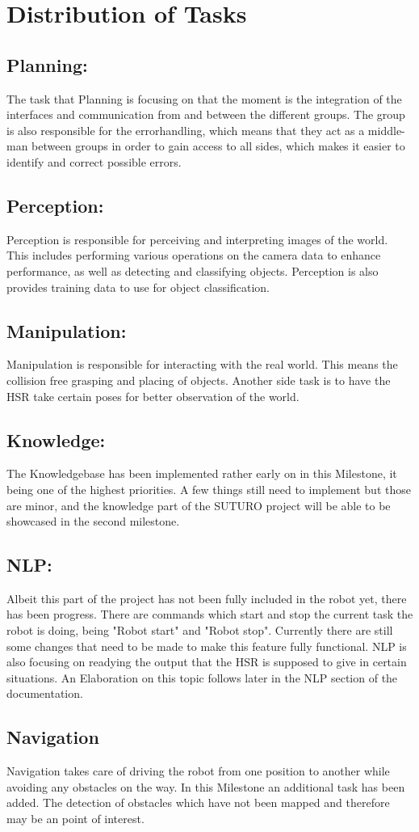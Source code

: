 \documentclass[main.tex]{subfiles}
\begin{document}
	
	\chapter{Distribution of Tasks}

		\section{Planning:}
		The task that Planning is focusing on that the moment is the integration of the interfaces and communication from and between the different groups. The group is also responsible for the errorhandling, which means that they act as a middle-man between groups in order to gain access to all sides, which makes it easier to identify and correct possible errors.
		
		\section{Perception:}
		Perception is responsible for perceiving and interpreting images of the world. This includes performing various operations on the camera data to enhance performance, as well as detecting and classifying objects. Perception is also provides training data to use for object classification.
		
		\section{Manipulation:}
		Manipulation is responsible for interacting with the real world. This means the collision free grasping and placing of objects. Another side task is to have the HSR take certain poses for better observation of the world. 
		
		\section{Knowledge:}
		The Knowledgebase has been implemented rather early on in this Milestone, it being one of the highest priorities. A few things still need to implement but those are minor, and the knowledge part of the SUTURO project will be able to be showcased in the second milestone. 
		
		\section{NLP:}
		Albeit this part of the project has not been fully included in the robot yet, there has been progress. There are commands which start and stop the current task the robot is doing, being "Robot start" and "Robot stop". Currently there are still some changes that need to be made to make this feature fully functional. NLP is also focusing on readying the output that the HSR is supposed to give in certain situations. An Elaboration on this topic follows later in the NLP section of the documentation.  
		
		\section{Navigation}
		Navigation takes care of driving the robot from one position to another while avoiding any obstacles on the way. In this Milestone an additional task has been added. The detection of obstacles which have not been mapped and therefore may be an point of interest.
\end{document}
